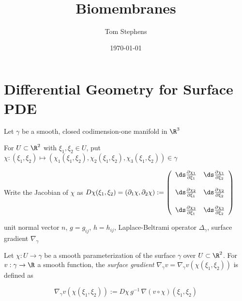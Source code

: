 \documentclass[10pt]{article}
\title{Biomembranes}
\author{Tom Stephens}
\date{ \today}
\begin{document}
\maketitle



\section{Differential Geometry for Surface PDE}

Let $\gamma$ be a smooth, closed codimension-one manifold in $\R^3$ 

For $U \subset \R^2$ with $\xi_1,\xi_2 \in U$, put  $\chi : (\xi_1,\xi_2)
\mapsto \left( \chi_1(\xi_1,\xi_2), \chi_2(\xi_1,\xi_2), \chi_3(\xi_1,\xi_2)
\right) \in \gamma$


Write the Jacobian of $\chi$ as $D\chi(\xi_1,\xi_2) = \left( \partial_1 \chi,
\partial_2 \chi \right) := \left(
\begin{array}{cc}
  \ds  \frac{\partial \chi_1}{\partial \xi_1} & \ds \frac{\partial \chi_1}{\partial \xi_2} \\ 
                                          &                                        \\
  \ds  \frac{\partial \chi_2}{\partial \xi_1} & \ds \frac{\partial \chi_2}{\partial \xi_2} \\ 
                                          &                                        \\
  \ds  \frac{\partial \chi_3}{\partial \xi_1} & \ds \frac{\partial \chi_3}{\partial \xi_2} 
\end{array} \right)$ 

\begin{definition} 
   
\end{definition}



\begin{definition} 
   
\end{definition}


unit normal vector $n$, $g = g_{ij}$, $h = h_{ij}$, Laplace-Beltrami operator $\Delta_{\gamma}$,
surface gradient $\nabla_{\gamma}$


\begin{definition} Let $\chi : U \to \gamma$ be
   a smooth parameterization of the surface $\gamma$ over $U \subset \R^2$. For
   $v : \gamma \to \R$  a smooth function, the 
   \emph{surface gradient} $\nabla_{\gamma} v = \nabla_\gamma
   v(\chi(\xi_1,\xi_2))$ is defined as 

   \begin{equation}
      \nabla_\gamma v(\chi(\xi_1,\xi_2)) := D\chi \, g^{-1} \,\nabla (v \circ
      \chi)(\xi_1,\xi_2)
      \label{eqn:surface_grad}
   \end{equation}
   
\end{definition}
\end{document}
